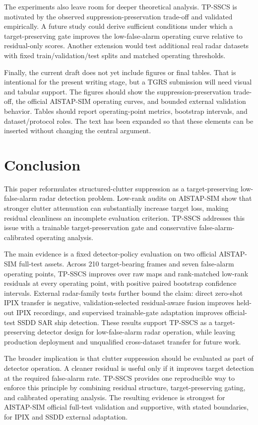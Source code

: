 \documentclass[journal]{IEEEtran}
\begin{document}
The experiments also leave room for deeper theoretical analysis. TP-SSCS is motivated by the observed suppression-preservation trade-off and validated empirically. A future study could derive sufficient conditions under which a target-preserving gate improves the low-false-alarm operating curve relative to residual-only scores. Another extension would test additional real radar datasets with fixed train/validation/test splits and matched operating thresholds.

Finally, the current draft does not yet include figures or final tables. That is intentional for the present writing stage, but a TGRS submission will need visual and tabular support. The figures should show the suppression-preservation trade-off, the official AISTAP-SIM operating curves, and bounded external validation behavior. Tables should report operating-point metrics, bootstrap intervals, and dataset/protocol roles. The text has been expanded so that these elements can be inserted without changing the central argument.

\section{Conclusion}

This paper reformulates structured-clutter suppression as a target-preserving low-false-alarm radar detection problem. Low-rank audits on AISTAP-SIM show that stronger clutter attenuation can substantially increase target loss, making residual cleanliness an incomplete evaluation criterion. TP-SSCS addresses this issue with a trainable target-preservation gate and conservative false-alarm-calibrated operating analysis.

The main evidence is a fixed detector-policy evaluation on two official AISTAP-SIM full-test assets. Across 210 target-bearing frames and seven false-alarm operating points, TP-SSCS improves over raw maps and rank-matched low-rank residuals at every operating point, with positive paired bootstrap confidence intervals. External radar-family tests further bound the claim: direct zero-shot IPIX transfer is negative, validation-selected residual-aware fusion improves held-out IPIX recordings, and supervised trainable-gate adaptation improves official-test SSDD SAR ship detection. These results support TP-SSCS as a target-preserving detector design for low-false-alarm radar operation, while leaving production deployment and unqualified cross-dataset transfer for future work.

The broader implication is that clutter suppression should be evaluated as part of detector operation. A cleaner residual is useful only if it improves target detection at the required false-alarm rate. TP-SSCS provides one reproducible way to enforce this principle by combining residual structure, target-preserving gating, and calibrated operating analysis. The resulting evidence is strongest for AISTAP-SIM official full-test validation and supportive, with stated boundaries, for IPIX and SSDD external adaptation.
\end{document}
